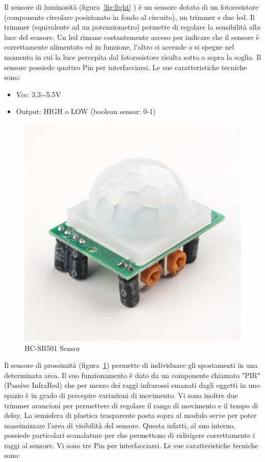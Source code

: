 Il sensore di luminosit\`a (figura~\ref{fig:light} ) \`e un sensore dotato di un fotoresistore (componente circolare posizionato in fondo al circuito), un trimmer e due led. Il trimmer (equivalente ad un potenziometro) permette di regolare la sensibilità alla luce del sensore. Un led rimane costantemente acceso per indicare che il sensore \`e correttamente alimentato ed in funzione, l'altro si accende o si spegne nel momento in cui la luce percepita dal fotoresistore risulta sotto o sopra la soglia. Il sensore possiede quattro Pin per interfacciarsi.
Le sue caratteristiche tecniche sono:

\begin{itemize}
	\item Vcc: 3.3$\sim$5.5V
	\item Output: HIGH o LOW (boolean sensor: 0-1)
\end{itemize}

\newpage

\begin{figure}
	\centering
	\includegraphics[width=0.7\linewidth]{Figures/Sensors&Rasp/pir}
	\caption[PIR] {HC-SR501 Sensor}
	\label{fig:pir}
\end{figure}

Il sensore di prossimit\`a (figura~\ref{fig:pir}) permette di individuare gli spostamenti in una determinata area. Il suo funzionamento \`e dato da un componente chiamato "PIR" (Passive InfraRed) che per mezzo dei raggi infrarossi emanati dagli oggetti in uno spazio \`e in grado di percepire variazioni di movimento. Vi sono inoltre due trimmer arancioni per permettere di regolare il range di movimento e il tempo di delay. La semisfera di plastica trasparente posta sopra al modulo serve per poter massimizzare l'area di visibilità del sensore. Questa infatti, al suo interno, possiede particolari scanalature per che permettono di ridirigere correttamente i raggi al sensore. Vi sono tre Pin per interfacciarsi.
Le sue caratteristiche tecniche sono:

